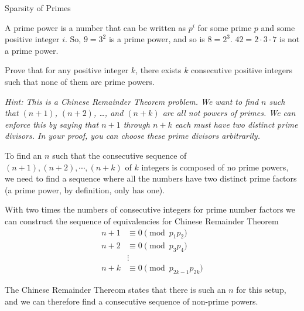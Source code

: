 \begin{homeworkProblem}{Sparsity of Primes}

    A prime power is a number that can be written as $p^i$ for some prime $p$ and some
    positive integer $i$. So, $9 = 3^2$ is a prime power, and so is $8 = 2^3$. $42 = 2 \cdot 3 \cdot 7$ is not
    a prime power.

    Prove that for any positive integer $k$, there exists $k$ consecutive positive integers
    such that none of them are prime powers.

    \emph{Hint: This is a Chinese Remainder Theorem problem. We want to find $n$ such that $(n + 1)$, $(n + 2)$, \ldots, and $(n + k)$ are all not powers of primes. We can enforce this by saying that $n + 1$ through $n + k$ each must have two distinct prime divisors. In your proof, you can choose these prime divisors arbitrarily.}

    \solution

    To find an $n$ such that the consecutive sequence of $(n+1), (n+2), \cdots, (n+k)$ of
    $k$ integers is composed of no prime powers, we need to find a sequence where 
    all the numbers have two distinct prime factors (a prime power, by definition,
    only has one). 

    With two times the numbers of consecutive integers for prime number factors
    we can construct the sequence of equivalencies for Chinese Remainder Theorem
    \[
        \begin{split}
            n + 1 &\equiv 0 \pmod{p_1 p_2} \\
            n + 2 &\equiv 0 \pmod{p_3 p_4} \\
            &\vdots \\
            n + k &\equiv 0 \pmod{p_{2k-1} p_{2k}}
        \end{split}   
    \]

    The Chinese Remainder Thereom states that there is such an $n$ for this setup,
    and we can therefore find a consecutive sequence of non-prime powers.

\end{homeworkProblem}